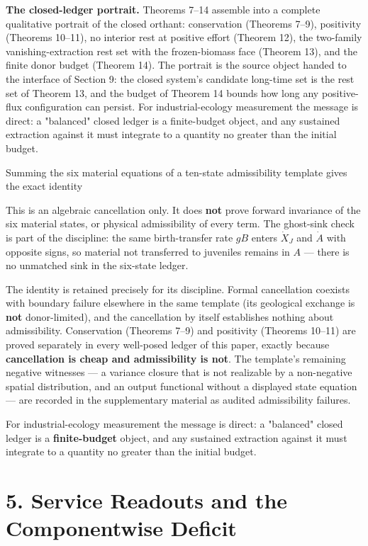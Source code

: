 \documentclass[11pt]{article}
\begin{document}
\textbf{The closed-ledger portrait.} Theorems 7--14 assemble into a complete qualitative portrait of the closed orthant: conservation (Theorems 7--9), positivity (Theorems 10--11), no interior rest at positive effort (Theorem 12), the two-family vanishing-extraction rest set with the frozen-biomass face (Theorem 13), and the finite donor budget (Theorem 14). The portrait is the source object handed to the interface of Section 9: the closed system's candidate long-time set is the rest set of Theorem 13, and the budget of Theorem 14 bounds how long any positive-flux configuration can persist. For industrial-ecology measurement the message is direct: a "balanced" closed ledger is a finite-budget object, and any sustained extraction against it must integrate to a quantity no greater than the initial budget.

\vspace{0.8em}

Summing the six material equations of a ten-state admissibility template gives the exact identity

This is an algebraic cancellation only. It does \textbf{not} prove forward invariance of the six material states, or physical admissibility of every term. The ghost-sink check is part of the discipline: the same birth-transfer rate \(gB\) enters \(\dot X_J\) and \(\dot A\) with opposite signs, so material not transferred to juveniles remains in \(A\) --- there is no unmatched sink in the six-state ledger.

The identity is retained precisely for its discipline. Formal cancellation coexists with boundary failure elsewhere in the same template (its geological exchange is \textbf{not} donor-limited), and the cancellation by itself establishes nothing about admissibility. Conservation (Theorems 7--9) and positivity (Theorems 10--11) are proved separately in every well-posed ledger of this paper, exactly because \textbf{cancellation is cheap and admissibility is not}. The template's remaining negative witnesses --- a variance closure that is not realizable by a non-negative spatial distribution, and an output functional without a displayed state equation --- are recorded in the supplementary material as audited admissibility failures.

For industrial-ecology measurement the message is direct: a "balanced" closed ledger is a \textbf{finite-budget} object, and any sustained extraction against it must integrate to a quantity no greater than the initial budget.

\section*{5. Service Readouts and the Componentwise Deficit}\label{5-service-readouts-and-the-componentwise-deficit}
\end{document}
